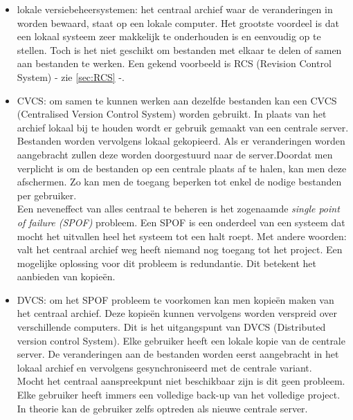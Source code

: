 \begin{itemize}
	\item lokale versiebeheersystemen: het centraal archief waar de veranderingen in worden bewaard, staat op een lokale computer. Het grootste voordeel is dat een lokaal systeem zeer makkelijk te onderhouden is en eenvoudig op te stellen. Toch is het niet geschikt om bestanden met elkaar te  delen of samen aan bestanden te werken. Een gekend voorbeeld is RCS (Revision Control System) - zie \ref{sec:RCS} -. \\
	
	\item CVCS: om samen te kunnen werken aan dezelfde bestanden kan een CVCS (Centralised Version Control System) worden gebruikt. In plaats van het archief lokaal bij te houden wordt er gebruik gemaakt van een centrale server. Bestanden worden vervolgens lokaal gekopieerd. Als er veranderingen worden aangebracht zullen deze worden doorgestuurd naar de server.Doordat men verplicht is om de bestanden op een centrale plaats af te halen, kan men deze afschermen. Zo kan men de toegang beperken tot enkel de nodige bestanden per gebruiker. \\
	
Een neveneffect van alles centraal te beheren is het zogenaamde \textit{single point of failure (SPOF)} probleem. Een SPOF is een onderdeel van een systeem dat mocht het uitvallen heel het systeem tot een halt roept. Met andere woorden: valt het centraal archief weg heeft niemand nog toegang tot het project. Een mogelijke oplossing voor dit probleem is redundantie. Dit betekent het aanbieden van kopieën. \autocite{Sun2007}\\

	\item DVCS: om het SPOF probleem te voorkomen kan men kopieën maken van het centraal archief. Deze kopieën kunnen vervolgens worden verspreid over verschillende computers. Dit is het uitgangspunt van DVCS (Distributed version control System). Elke gebruiker heeft een lokale kopie van de centrale server. De veranderingen aan de bestanden worden eerst aangebracht in het lokaal archief en vervolgens gesynchroniseerd met de centrale variant.\\

Mocht het centraal aanspreekpunt niet beschikbaar zijn is dit geen probleem. Elke gebruiker heeft immers een volledige back-up van het volledige project. In theorie kan de gebruiker zelfs optreden als nieuwe centrale server.
\end{itemize}


